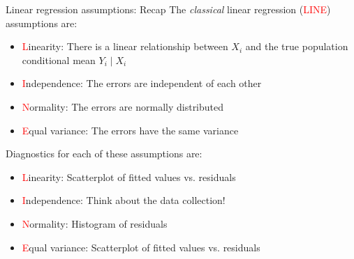 \documentclass[10pt,t]{beamer}
\begin{document}
\begin{frame}{Linear regression assumptions: Recap}
The \textit{classical} linear regression (\textcolor{red}{LINE}) assumptions are:

\vspace{0.3cm}

\begin{itemize}
	\item \textcolor{red}{L}inearity: There is a linear relationship between $X_i$ and the true population conditional mean $Y_i \mid X_i$
	\item \textcolor{red}{I}ndependence: The errors are independent of each other
	\item \textcolor{red}{N}ormality: The errors are normally distributed
	\item \textcolor{red}{E}qual variance: The errors have the same variance
\end{itemize}

\vspace{0.3cm}

Diagnostics for each of these assumptions are:

\vspace{0.3cm}

\begin{itemize}
	\item \textcolor{red}{L}inearity: Scatterplot of fitted values vs. residuals
	\item \textcolor{red}{I}ndependence: Think about the data collection!
	\item \textcolor{red}{N}ormality: Histogram of residuals
	\item \textcolor{red}{E}qual variance: Scatterplot of fitted values vs. residuals
\end{itemize}

\end{frame}
\end{document}
